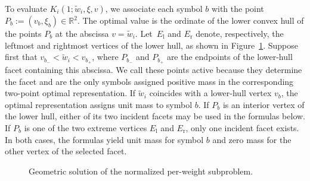 \documentclass{article}
\begin{document}
To evaluate $K_i(1;\widetilde w_i,\xi,v)$, we associate each symbol $b$ with the
point $P_b:=(v_b,\xi_b)\in\mathbb R^2$. The optimal value is the ordinate of
the lower convex hull of the points $P_b$ at the abscissa
$v=\widetilde w_i$. Let~$E_{\mathrm l}$ and $E_{\mathrm r}$ denote,
respectively, the leftmost and rightmost vertices of the lower hull, as shown
in Figure~\ref{fig:lower-hull}. Suppose first that
$v_{b_-}<\widetilde w_i<v_{b_+}$, where $P_{b_-}$ and $P_{b_+}$ are the
endpoints of the lower-hull facet containing this abscissa. We call these
points active because they determine the facet and are the only symbols assigned
positive mass in the corresponding two-point optimal representation. 
If $\widetilde w_i$ coincides with a lower-hull
vertex $v_b$, the optimal representation assigns unit mass to symbol $b$.
If $P_b$ is an interior vertex of the lower hull, either of its two incident
facets may be used in the formulas below. If $P_b$ is one of the two extreme
vertices $E_{\mathrm l}$ and $E_{\mathrm r}$, only one incident facet exists.
In both cases, the formulas yield unit mass for symbol $b$ and zero mass for
the other vertex of the selected facet.

\begin{figure}[ht]
\centering
{}
\caption{Geometric solution of the normalized per-weight subproblem.}
\label{fig:lower-hull}
\end{figure}
\end{document}
